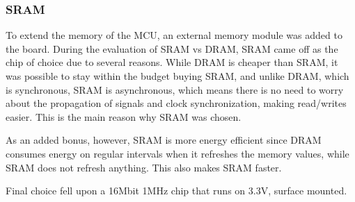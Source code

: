 
\subsubsection{SRAM}

To extend the memory of the MCU, an external memory module was added to the
board. During the evaluation of SRAM vs DRAM, SRAM came off as the chip of
choice due to several reasons. While DRAM is cheaper than SRAM, it was possible
to stay within the budget buying SRAM, and unlike DRAM, which is synchronous,
SRAM is asynchronous, which means there is no need to worry about the
propagation of signals and clock synchronization, making read/writes easier.
This is the main reason why SRAM was chosen.

As an added bonus, however, SRAM is more energy efficient since DRAM consumes
energy on regular intervals when it refreshes the memory values, while SRAM does
not refresh anything. This also makes SRAM faster.

Final choice fell upon a 16Mbit 1MHz chip that runs on 3.3V, surface mounted.

